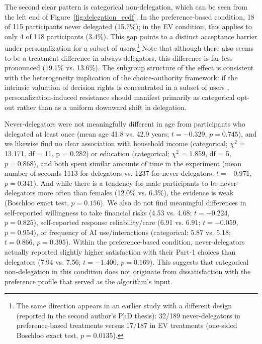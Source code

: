 \documentclass[a4paper, 12pt, fleqn]{article}
\theoremstyle{definition}
\begin{document}
The second clear pattern is categorical non-delegation, which can be seen from the left end of Figure~\ref{fig:delegation_ecdf}. In the preference-based condition, 18 of 115 participants never delegated (15.7\%); in the EV condition, this applies to only 4 of 118 participants (3.4\%). This gap points to a distinct acceptance barrier under personalization for a subset of users.\footnote{The same direction appears in an earlier study with a different design (reported in the second author's PhD thesis): 32/189 never-delegators in preference-based treatments versus 17/187 in EV treatments (one-sided Boschloo exact test, $p = 0.0135$).} Note that although there also seems to be a treatment difference in always-delegators, this difference is far less pronounced (19.1\% vs. 13.6\%). The subgroup structure of the effect is consistent with the heterogeneity implication of the choice-authority framework: if the intrinsic valuation of decision rights is concentrated in a subset of users \citep{Bartling2014,Owens2014}, personalization-induced resistance should manifest primarily as categorical opt-out rather than as a uniform downward shift in delegation.

Never-delegators were not meaningfully different in age from participants who delegated at least once (mean age 41.8 vs. 42.9 years; $t = -0.329$, $p = 0.745$), and we likewise find no clear association with household income (categorical; \(\chi^2\) = 13.171, df = 11, p = 0.282) or education (categorical; \(\chi^2\) = 1.859, df = 5, $p = 0.868$), and both spent similar amounts of time in the experiment (mean number of seconds 1113 for delegators vs. 1237 for never-delegators, $t = -0.971$, $p = 0.341$). And while there is a tendency for male participants to be never-delegators more often than females (12.0\% vs. 6.3\%), the evidence is weak (Boschloo exact test, $p = 0.156$). We also do not find meaningful differences in self-reported willingness to take financial risks (4.53 vs. 4.68; $t = -0.224$, $p = 0.825$), self-reported response reliability/care (6.91 vs. 6.91; $t = -0.059$, $p = 0.954$), or frequency of AI use/interactions (categorical: 5.87 vs. 5.18; $t = 0.866$, $p = 0.395$).
Within the preference-based condition, never-delegators actually reported slightly higher satisfaction with their Part-1 choices than delegators (7.94 vs. 7.56; $t = -1.400$, $p = 0.169$). This suggests that categorical non-delegation in this condition does not originate from dissatisfaction with the preference profile that served as the algorithm's input.
\end{document}
